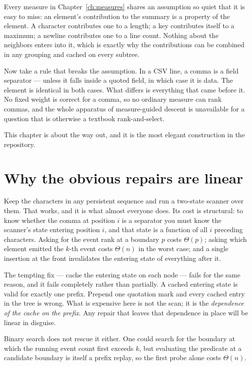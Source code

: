 \documentclass[11pt,twoside,openright]{book}
\begin{document}
\noindent
Every measure in Chapter~\ref{ch:measures} shares an assumption so quiet that it
is easy to miss: an element's contribution to the summary is a property of the
element. A character contributes one to a length; a key contributes itself to a
maximum; a newline contributes one to a line count. Nothing about the neighbors
enters into it, which is exactly why the contributions can be combined in any
grouping and cached on every subtree.

Now take a rule that breaks the assumption. In a CSV line, a comma is a field
separator --- unless it falls inside a quoted field, in which case it is data. The
element is identical in both cases. What differs is everything that came before
it. No fixed weight is correct for a comma, so no ordinary measure can rank
commas, and the whole apparatus of measure-guided descent is unavailable for a
question that is otherwise a textbook rank-and-select.

This chapter is about the way out, and it is the most elegant construction in the
repository.

\section{Why the obvious repairs are linear}

Keep the characters in any persistent sequence and run a two-state scanner over
them. That works, and it is what almost everyone does. Its cost is structural:
to know whether the comma at position $i$ is a separator you must know the
scanner's state entering position $i$, and that state is a function of all $i$
preceding characters. Asking for the event rank at a boundary $p$ costs
$\Theta(p)$; asking which element emitted the $k$-th event costs $\Theta(n)$ in
the worst case; and a single insertion at the front invalidates the entering
state of everything after it.

The tempting fix --- cache the entering state on each node --- fails for the same
reason, and it fails completely rather than partially. A cached entering state is
valid for exactly one prefix. Prepend one quotation mark and every cached entry
in the tree is wrong. What is expensive here is not the scan; it is the
\emph{dependence of the cache on the prefix}. Any repair that leaves that
dependence in place will be linear in disguise.

Binary search does not rescue it either. One could search for the boundary at
which the running event count first exceeds $k$, but evaluating the predicate at
a candidate boundary is itself a prefix replay, so the first probe alone costs
$\Theta(n)$.
\end{document}
